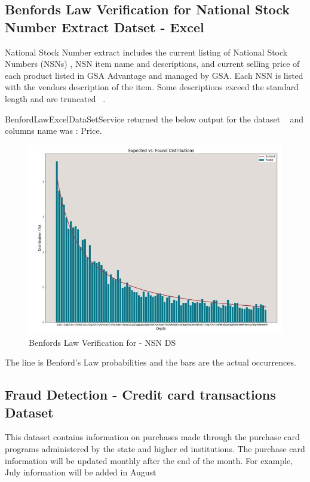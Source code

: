\subsection{Benfords Law Verification for National Stock 
Number Extract Datset - Excel}
National Stock Number extract includes the current 
listing of National Stock Numbers (NSNs) , 
NSN item name and descriptions, and current 
selling price of each product listed in GSA 
Advantage and managed by GSA. Each NSN is 
listed with the vendors description of the item. 
Some descriptions exceed the standard length and are 
truncated ~\cite{hid-sp18-514-nsn-ds-desc}.

BenfordLawExcelDataSetService returned the below
output for the dataset ~\cite{hid-sp18-514-excelDatalocation}
and columns name was : Price.

\begin{figure}[!ht]
\centering\includegraphics[width=\columnwidth]{images/benford_nsn.JPG}
  \caption{Benfords Law Verification for - NSN DS}\label{f:NSN-ds-benfordlaw}
\end{figure}

The line is Benford’s Law probabilities and the bars are 
the actual occurrences.


\subsection{Fraud Detection - Credit card transactions Dataset}
This dataset contains information on purchases made through 
the purchase card programs administered by the state and higher 
ed institutions. The purchase card information will be updated monthly 
after the end of the month. For example, July information will 
be added in August ~\cite{hid-sp18-514-purchase-card-desc}

